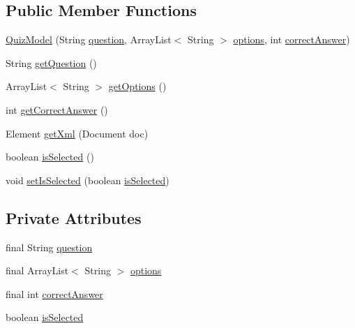 \subsection*{Public Member Functions}
\begin{DoxyCompactItemize}
\item 
\hyperlink{classorg_1_1buildmlearn_1_1toolkit_1_1templates_1_1QuizModel_ad7ac0923cded5b5ab11c0311098e1aca}{Quiz\+Model} (String \hyperlink{classorg_1_1buildmlearn_1_1toolkit_1_1templates_1_1QuizModel_a568dd3dc8d183927ffff7e8da7d45895}{question}, Array\+List$<$ String $>$ \hyperlink{classorg_1_1buildmlearn_1_1toolkit_1_1templates_1_1QuizModel_a95a23093c74841213041326f6e589fa6}{options}, int \hyperlink{classorg_1_1buildmlearn_1_1toolkit_1_1templates_1_1QuizModel_a73ff43704362adcf40f4aa2b7b53857a}{correct\+Answer})
\item 
String \hyperlink{classorg_1_1buildmlearn_1_1toolkit_1_1templates_1_1QuizModel_aefecb799e3e7738989a107f559dd44b8}{get\+Question} ()
\item 
Array\+List$<$ String $>$ \hyperlink{classorg_1_1buildmlearn_1_1toolkit_1_1templates_1_1QuizModel_a836e96e8dafbb46c95630d03ec6e2775}{get\+Options} ()
\item 
int \hyperlink{classorg_1_1buildmlearn_1_1toolkit_1_1templates_1_1QuizModel_ad0093665496e473a794700ef0d0b304b}{get\+Correct\+Answer} ()
\item 
Element \hyperlink{classorg_1_1buildmlearn_1_1toolkit_1_1templates_1_1QuizModel_ab40e946399a45e02e3c20d2dacc4bf0a}{get\+Xml} (Document doc)
\item 
boolean \hyperlink{classorg_1_1buildmlearn_1_1toolkit_1_1templates_1_1QuizModel_ac076dad02a8b2fd2cd3437b76d4291a3}{is\+Selected} ()
\item 
void \hyperlink{classorg_1_1buildmlearn_1_1toolkit_1_1templates_1_1QuizModel_aee131789e4b61f477436104d543f95d2}{set\+Is\+Selected} (boolean \hyperlink{classorg_1_1buildmlearn_1_1toolkit_1_1templates_1_1QuizModel_a4cda118e04f9c9a05034db2d28536274}{is\+Selected})
\end{DoxyCompactItemize}
\subsection*{Private Attributes}
\begin{DoxyCompactItemize}
\item 
final String \hyperlink{classorg_1_1buildmlearn_1_1toolkit_1_1templates_1_1QuizModel_a568dd3dc8d183927ffff7e8da7d45895}{question}
\item 
final Array\+List$<$ String $>$ \hyperlink{classorg_1_1buildmlearn_1_1toolkit_1_1templates_1_1QuizModel_a95a23093c74841213041326f6e589fa6}{options}
\item 
final int \hyperlink{classorg_1_1buildmlearn_1_1toolkit_1_1templates_1_1QuizModel_a73ff43704362adcf40f4aa2b7b53857a}{correct\+Answer}
\item 
boolean \hyperlink{classorg_1_1buildmlearn_1_1toolkit_1_1templates_1_1QuizModel_a4cda118e04f9c9a05034db2d28536274}{is\+Selected}
\end{DoxyCompactItemize}


